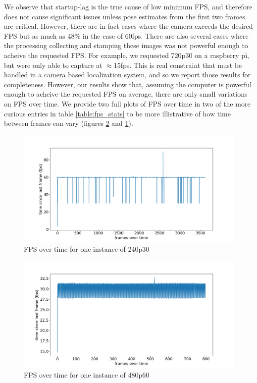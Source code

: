 \documentclass{article}
\begin{document}
    We observe that startup-lag is the true cause of low minimum FPS, and therefore does not cause significant issues unless pose estimates from the first two frames are critical. However, there are in fact cases where the camera exceeds the desired FPS but as much as 48\% in the case of 60fps. There are also several cases where the processing collecting and stamping these images was not powerful enough to acheive the requested FPS. For example, we requested 720p30 on a raspberry pi, but were only able to capture at $\approx$15fps. This is real constraint that must be handled in a camera based localization system, and so we report those results for completeness. However, our results show that, assuming the computer is powerful enough to acheive the requested FPS on average, there are only small variations on FPS over time. We provide two full plots of FPS over time in two of the more curious entries in table \ref{table:fps_stats} to be more illistrative of how time between frames can vary (figures \ref{fig:fps_plot_1} and \ref{fig:fps_plot_2}).

    \begin{figure}[H]
      \centering
      \includegraphics[width=0.8\linewidth]{./images/fps_plot_2.png}
      \caption{FPS over time for one instance of 240p30}
      \label{fig:fps_plot_2}
    \end{figure}

    \begin{figure}[H]
      \centering
      \includegraphics[width=0.8\linewidth]{./images/fps_plot_1.png}
      \caption{FPS over time for one instance of  480p60}
      \label{fig:fps_plot_1}
    \end{figure}
\end{document}
